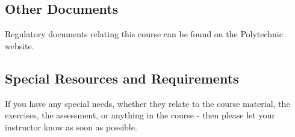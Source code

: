 \documentclass{article}
\begin{document}
\subsection*{Other Documents}
Regulatory documents relating this course can be found on the Polytechnic website.

\subsection*{Special Resources and Requirements}
If you have any special needs, whether they relate to the course material, the exercises, the assessment, or anything in the course -
then please let your instructor know as soon as possible.
\end{document}
